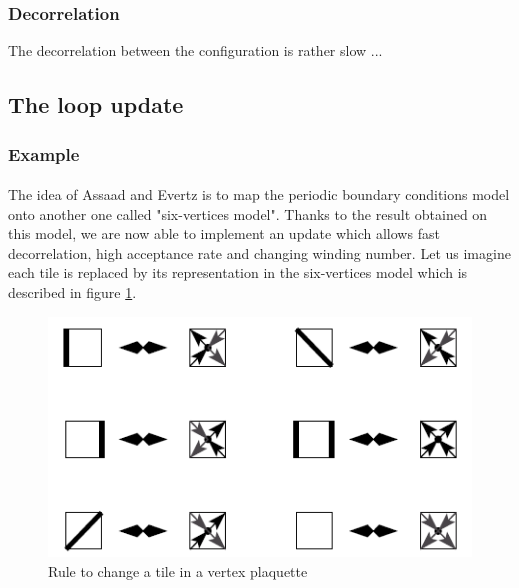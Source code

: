 \documentclass[a4paper,12pt,twoside]{article}
\begin{document}
	\subsubsection{Decorrelation} The decorrelation between the configuration is rather slow ...

	\subsection{The loop update}
	
	\subsubsection{Example}
	
	\paragraph{}The idea of Assaad and Evertz is to map the periodic boundary conditions model onto another one called "six-vertices model". Thanks to the result obtained on this model, we are now able to implement an update which allows fast decorrelation, high acceptance rate and changing winding number.
	Let us imagine each tile is replaced by its representation in the six-vertices model which is described in figure \ref{six_vertex}.
	\begin{figure}[!h]
		\centering
		\includegraphics[]{six_vertex.png}
		\caption{Rule to change a tile in a vertex plaquette}
		\label{six_vertex}
	\end{figure}
\end{document}
